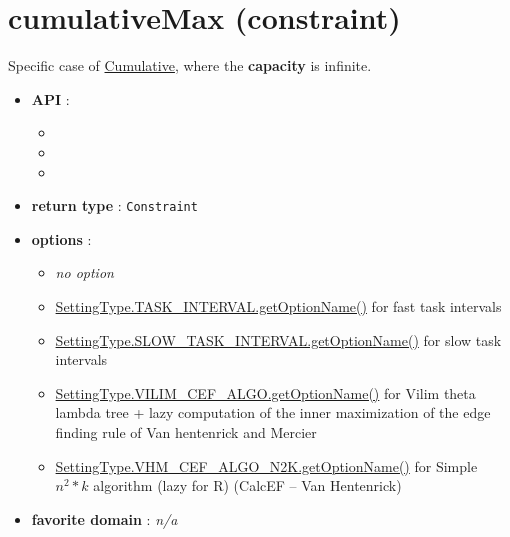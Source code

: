 \section{cumulativeMax (constraint)}\label{cumulativemax:cumulativemaxconstraint}\hypertarget{cumulativemax:cumulativemaxconstraint}{}
Specific case of \hyperlink{cumulative:cumulativeconstraint}{Cumulative}, where the \textbf{capacity} is infinite.

\begin{itemize}
	\item \textbf{API} :
	\begin{itemize}
		\item {}
		\item {}
		\item {}
	\end{itemize}
	\item \textbf{return type} : \texttt{Constraint}
	\item \textbf{options} :
	\begin{itemize}
		\item \emph{no option}
		\item \hyperlink{ccumulativeti:ccumulativetioptions}{SettingType.TASK\_INTERVAL.getOptionName()} for fast task intervals
		\item \hyperlink{ccumulativesti:ccumulativestioptions}{SettingType.SLOW\_TASK\_INTERVAL.getOptionName()} for slow task intervals
		\item \hyperlink{ccumulativecef:ccumulativecefoptions}{SettingType.VILIM\_CEF\_ALGO.getOptionName()} for Vilim theta lambda tree + lazy computation of the inner maximization of the edge finding rule of Van hentenrick and Mercier
		\item \hyperlink{ccumulativescef:ccumulativescefoptions}{SettingType.VHM\_CEF\_ALGO\_N2K.getOptionName()} for Simple $n^2 * k$ algorithm (lazy for R) (CalcEF -- Van Hentenrick)
	\end{itemize}
	\item \textbf{favorite domain} : \emph{n/a}
\end{itemize}